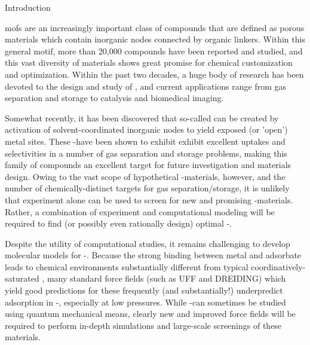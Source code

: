 \begin{section}{Introduction}

\Glspl{mof} are an increasingly important class of compounds that are
defined as porous
materials which contain inorganic nodes connected by organic linkers. Within
this general motif, more than 20,000 compounds have been reported and
studied,\cite{Furukawa2013} and this vast diversity of \mof materials shows great promise
for chemical customization and optimization. Within the past two decades, a
huge body of research has been devoted to the design and study of \mofs, and
current applications range from gas separation and storage to catalysis and
biomedical imaging.\cite{Furukawa2013}

Somewhat recently, it has been discovered that so-called \cus \mofs can be
created by activation of solvent-coordinated inorganic nodes to yield exposed
(or 'open') metal sites.\cite{Millward2005b,Dietzel2009,Dzubak2012} These \cus-\mofs have
been shown to exhibit exhibit excellent uptakes and selectivities in a number
of gas separation and storage problems,\cite{Czaja2009,Millward2005b,Dietzel2009}
making this family of compounds an excellent target for future
investigation and materials design. Owing to the vast scope of hypothetical
\cus-\mof materials, however, and the number of chemically-distinct targets
for gas separation/storage, it is unlikely that experiment alone can
be used to screen for new and promising \cus-\mof materials.\cite{Krishna2011} 
Rather, a combination of
experiment and computational modeling will be required to find (or possibly
even rationally design) optimal \cus-\mofs.\cite{Getman2012,Czaja2009,Krishna2011}

Despite the utility of computational studies, it remains challenging to
develop molecular models for \cus-\mofs.\cite{Dzubak2012} Because the strong
binding between metal and adsorbate leads to chemical environments
substantially different from typical coordinatively-saturated \mofs, many
standard force fields (such as UFF and DREIDING) which yield good predictions
for these \mofs frequently (and substantially!) underpredict adsorption in
\cus-\mofs, especially at low
pressures.\cite{Yazaydin2009,Krishna2011,Getman2012} While \cus-\mofs can
sometimes be studied using quantum mechanical
means,\cite{Getman2012,Valenzano2010} clearly
new and improved force fields will be required to perform in-depth simulations
and large-scale screenings of these materials.


\end{section}
